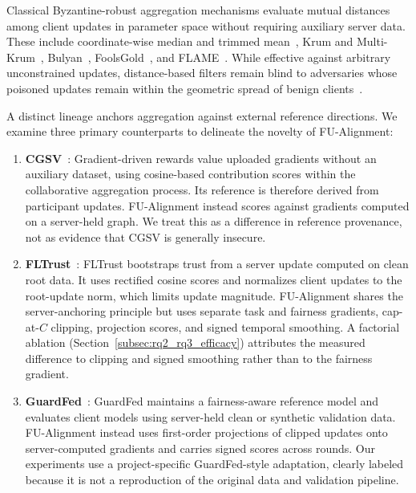 Classical Byzantine-robust aggregation mechanisms evaluate mutual distances among client updates in parameter space without requiring auxiliary server data. These include coordinate-wise median and trimmed mean~\citep{yin2018byzantine}, Krum and Multi-Krum~\citep{blanchard2017krum}, Bulyan~\citep{mhamdi2018hidden}, FoolsGold~\citep{fung2018mitigating}, and FLAME~\citep{nguyen2022flame}. While effective against arbitrary unconstrained updates, distance-based filters remain blind to adversaries whose poisoned updates remain within the geometric spread of benign clients~\citep{eabfl2024, kasyap2025attack}.

A distinct lineage anchors aggregation against external reference directions. We examine three primary counterparts to delineate the novelty of FU-Alignment:
\begin{enumerate}[leftmargin=*]
    \item \textbf{CGSV}~\citep{xu2021gradient}: Gradient-driven rewards value uploaded gradients without an auxiliary dataset, using cosine-based contribution scores within the collaborative aggregation process. Its reference is therefore derived from participant updates. FU-Alignment instead scores against gradients computed on a server-held graph. We treat this as a difference in reference provenance, not as evidence that CGSV is generally insecure.
    \item \textbf{FLTrust}~\citep{cao2021fltrust}: FLTrust bootstraps trust from a server update computed on clean root data. It uses rectified cosine scores and normalizes client updates to the root-update norm, which limits update magnitude. FU-Alignment shares the server-anchoring principle but uses separate task and fairness gradients, cap-at-$C$ clipping, projection scores, and signed temporal smoothing. A factorial ablation (Section~\ref{subsec:rq2_rq3_efficacy}) attributes the measured difference to clipping and signed smoothing rather than to the fairness gradient.
    \item \textbf{GuardFed}~\citep{li2025guardfed}: GuardFed maintains a fairness-aware reference model and evaluates client models using server-held clean or synthetic validation data. FU-Alignment instead uses first-order projections of clipped updates onto server-computed gradients and carries signed scores across rounds. Our experiments use a project-specific GuardFed-style adaptation, clearly labeled because it is not a reproduction of the original data and validation pipeline.
\end{enumerate}

